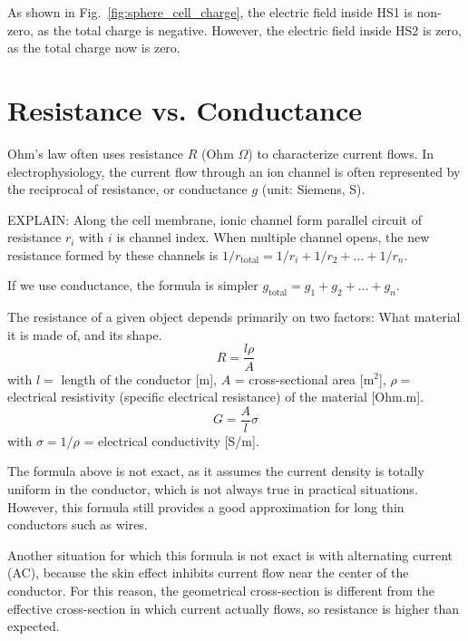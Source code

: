 As shown in Fig.~\ref{fig:sphere_cell_charge}, the electric field
inside HS1 is non-zero, as the total charge is negative. However, the
electric field inside HS2 is zero, as the total charge now is zero.


\section{Resistance vs. Conductance}
\label{sec:resistance-conductance}

Ohm's law often uses resistance $R$ (Ohm $\Omega$) to characterize current
flows. In electrophysiology, the current flow through an ion channel is often
represented by the reciprocal of resistance, or conductance $g$ (unit:
Siemens, S).

\begin{mdframed}
EXPLAIN:
Along the cell membrane, ionic channel form parallel circuit of resistance $r_i$
with $i$ is channel index. When multiple channel opens, the new resistance
formed by these channels is $1/r_\text{total} = 1/r_i + 1/r_2 + \ldots + 1/r_n$. 

If we use conductance, the formula is simpler 
$g_\text{total}=g_1 + g_2 + \ldots + g_n$.

\end{mdframed}


The resistance of a given object depends primarily on two factors: What material
it is made of, and its shape.
\begin{equation}
R = \frac{l\rho}{A}
\end{equation}
with $l = $ length of the conductor [m], $A$ = cross-sectional area [m$^2$],
$\rho = $ electrical resistivity (specific electrical resistance) of the
material [Ohm.m].
\begin{equation}
G = \frac{A}{l}\sigma
\end{equation}
with $\sigma = 1/\rho$ = electrical conductivity [S/m].

The formula above is not exact, as it assumes the current density is totally
uniform in the conductor, which is not always true in practical situations.
However, this formula still provides a good approximation for long thin
conductors such as wires.

Another situation for which this formula is not exact is with alternating
current (AC), because the skin effect inhibits current flow near the center of
the conductor. For this reason, the geometrical cross-section is different from
the effective cross-section in which current actually flows, so resistance is
higher than expected.

